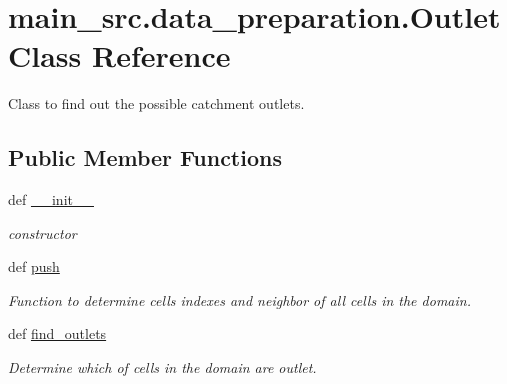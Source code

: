 \hypertarget{classmain__src_1_1data__preparation_1_1Outlet}{\section{main\-\_\-src.\-data\-\_\-preparation.\-Outlet Class Reference}
\label{classmain__src_1_1data__preparation_1_1Outlet}
}


Class to find out the possible catchment outlets.  


\subsection*{Public Member Functions}
\begin{DoxyCompactItemize}
\item 
\hypertarget{classmain__src_1_1data__preparation_1_1Outlet_a329fccf8c7686620eda1fb9f2c0ef27d}{def \hyperlink{classmain__src_1_1data__preparation_1_1Outlet_a329fccf8c7686620eda1fb9f2c0ef27d}{\-\_\-\-\_\-init\-\_\-\-\_\-}}\label{classmain__src_1_1data__preparation_1_1Outlet_a329fccf8c7686620eda1fb9f2c0ef27d}

\begin{DoxyCompactList}\small\item\em constructor \end{DoxyCompactList}\item 
\hypertarget{classmain__src_1_1data__preparation_1_1Outlet_a6844e70779cd1c0bdc8c3bd99d9d6cf4}{def \hyperlink{classmain__src_1_1data__preparation_1_1Outlet_a6844e70779cd1c0bdc8c3bd99d9d6cf4}{push}}\label{classmain__src_1_1data__preparation_1_1Outlet_a6844e70779cd1c0bdc8c3bd99d9d6cf4}

\begin{DoxyCompactList}\small\item\em Function to determine cells indexes and neighbor of all cells in the domain. \end{DoxyCompactList}\item 
def \hyperlink{classmain__src_1_1data__preparation_1_1Outlet_a65b15950e069d7d6b3ca19f6ad733081}{find\-\_\-outlets}
\begin{DoxyCompactList}\small\item\em Determine which of cells in the domain are outlet. \end{DoxyCompactList}\end{DoxyCompactItemize}
